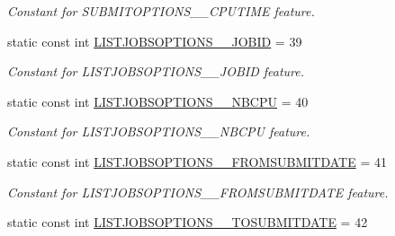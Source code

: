 \begin{DoxyCompactItemize}
\begin{DoxyCompactList}\small\item\em Constant for SUBMITOPTIONS\_\-\_\-CPUTIME feature. \item\end{DoxyCompactList}\item 
\hypertarget{classTMS__Data_1_1TMS__DataPackage_a6470d3fc905edd3d4c941f994b6e988b}{
static const int \hyperlink{classTMS__Data_1_1TMS__DataPackage_a6470d3fc905edd3d4c941f994b6e988b}{LISTJOBSOPTIONS\_\-\_\-JOBID} = 39}
\label{classTMS__Data_1_1TMS__DataPackage_a6470d3fc905edd3d4c941f994b6e988b}

\begin{DoxyCompactList}\small\item\em Constant for LISTJOBSOPTIONS\_\-\_\-JOBID feature. \item\end{DoxyCompactList}\item 
\hypertarget{classTMS__Data_1_1TMS__DataPackage_a40d03e43afd02e5f5d2afaa9d3d9a752}{
static const int \hyperlink{classTMS__Data_1_1TMS__DataPackage_a40d03e43afd02e5f5d2afaa9d3d9a752}{LISTJOBSOPTIONS\_\-\_\-NBCPU} = 40}
\label{classTMS__Data_1_1TMS__DataPackage_a40d03e43afd02e5f5d2afaa9d3d9a752}

\begin{DoxyCompactList}\small\item\em Constant for LISTJOBSOPTIONS\_\-\_\-NBCPU feature. \item\end{DoxyCompactList}\item 
\hypertarget{classTMS__Data_1_1TMS__DataPackage_a37f937bfca83117cbd65f9660e92e179}{
static const int \hyperlink{classTMS__Data_1_1TMS__DataPackage_a37f937bfca83117cbd65f9660e92e179}{LISTJOBSOPTIONS\_\-\_\-FROMSUBMITDATE} = 41}
\label{classTMS__Data_1_1TMS__DataPackage_a37f937bfca83117cbd65f9660e92e179}

\begin{DoxyCompactList}\small\item\em Constant for LISTJOBSOPTIONS\_\-\_\-FROMSUBMITDATE feature. \item\end{DoxyCompactList}\item 
\hypertarget{classTMS__Data_1_1TMS__DataPackage_a50cac112c085cea00c9f0af89b454e6a}{
static const int \hyperlink{classTMS__Data_1_1TMS__DataPackage_a50cac112c085cea00c9f0af89b454e6a}{LISTJOBSOPTIONS\_\-\_\-TOSUBMITDATE} = 42}
\label{classTMS__Data_1_1TMS__DataPackage_a50cac112c085cea00c9f0af89b454e6a}


\end{DoxyCompactItemize}
